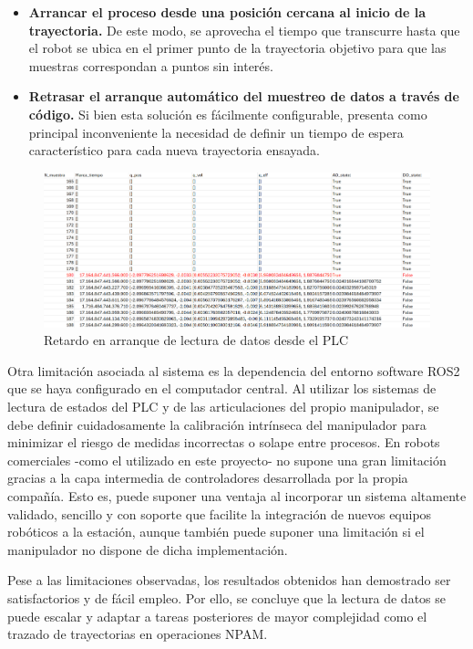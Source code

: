 \begin{itemize}
    \item \textbf{Arrancar el proceso desde una posición cercana al inicio de la trayectoria.} De este modo, se aprovecha el tiempo que transcurre hasta que el robot se ubica en el primer punto de la trayectoria objetivo para que las muestras correspondan a puntos sin interés.
    \item \textbf{Retrasar el arranque automático del muestreo de datos a través de código.} Si bien esta solución es fácilmente configurable, presenta como principal inconveniente la necesidad de definir un tiempo de espera característico para cada nueva trayectoria ensayada.
\end{itemize}

\begin{figure}[h!]
    \centering
    \includegraphics[scale=0.50]{figuras/ensayo_lectura_datos/limitacion_lectura_datos_frecuencia.png}
    \caption{Retardo en arranque de lectura de datos desde el \acrshort{PLC}}
    \label{fig: limitacion_lectura_datos_frecuencia retardo}
\end{figure}

Otra limitación asociada al sistema es la dependencia del entorno software ROS2 que se haya configurado en el computador central. Al utilizar los sistemas de lectura de estados del \acrshort{PLC} y de las articulaciones del propio manipulador, se debe definir cuidadosamente la calibración intrínseca del manipulador para minimizar el riesgo de medidas incorrectas o solape entre procesos. En robots comerciales -como el utilizado en este proyecto- no supone una gran limitación gracias a la capa intermedia de controladores desarrollada por la propia compañía. Esto es, puede suponer una ventaja al incorporar un sistema altamente validado, sencillo y con soporte que facilite la integración de nuevos equipos robóticos a la estación, aunque también puede suponer una limitación si el manipulador no dispone de dicha implementación.

Pese a las limitaciones observadas, los resultados obtenidos han demostrado ser satisfactorios y de fácil empleo. Por ello, se concluye que la lectura de datos se puede escalar y adaptar a tareas posteriores de mayor complejidad como el trazado de trayectorias en operaciones \acrshort{NPAM}.